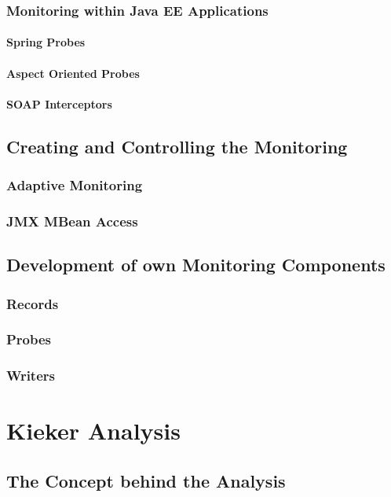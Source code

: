 \documentclass[paper=a4,twoside=false,fontsize=11pt,numbers=noenddot,version=first,bibliography=totoc,headsepline]{scrbook}
\begin{document}
			\subsection{Monitoring within Java EE Applications}
				\subsubsection{Spring Probes}
				\subsubsection{Aspect Oriented Probes}
				\subsubsection{SOAP Interceptors}
		\section{Creating and Controlling the Monitoring}
			\subsection{Adaptive Monitoring}
			\subsection{JMX MBean Access}
		\section{Development of own Monitoring Components}
			\subsection{Records}
			\subsection{Probes}
			\subsection{Writers}

	\chapter{Kieker Analysis}\label{chp:Analysis}
		\section{The Concept behind the Analysis}
\end{document}
